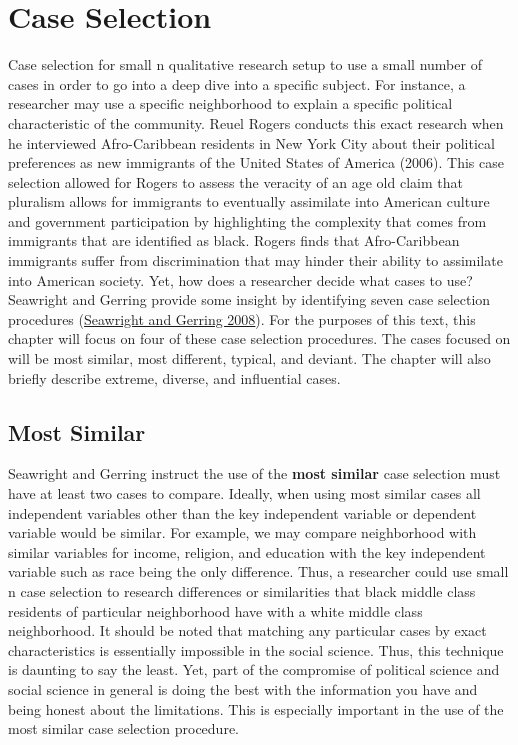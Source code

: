 \documentclass{book}
\begin{document}
\hypertarget{case-selection}{%
\section{Case Selection}\label{case-selection}}

Case selection for small n qualitative research setup to use a small number of
cases in order to go into a deep dive into a specific subject. For instance, a
researcher may use a specific neighborhood to explain a specific political
characteristic of the community. Reuel Rogers conducts this exact research
when he interviewed Afro-Caribbean residents in New York City about their
political preferences as new immigrants of the United States of America
(2006). This case selection allowed for Rogers to assess the veracity of an
age old claim that pluralism allows for immigrants to eventually assimilate
into American culture and government participation by highlighting the
complexity that comes from immigrants that are identified as black. Rogers
finds that Afro-Caribbean immigrants suffer from discrimination that may
hinder their ability to assimilate into American society. Yet, how does a
researcher decide what cases to use? Seawright and Gerring provide some
insight by identifying seven case selection procedures
(\protect\hyperlink{ref-seawright2008case}{Seawright and Gerring 2008}). For
the purposes of this text, this chapter will focus on four of these case
selection procedures. The cases focused on will be most similar, most
different, typical, and deviant. The chapter will also briefly describe
extreme, diverse, and influential cases.

\hypertarget{most-similar}{%
\subsection{Most Similar}\label{most-similar}}

Seawright and Gerring instruct the use of the \textbf{most similar} case
selection must have at least two cases to compare. Ideally, when using most
similar cases all independent variables other than the key independent
variable or dependent variable would be similar. For example, we may compare
neighborhood with similar variables for income, religion, and education with
the key independent variable such as race being the only difference. Thus, a
researcher could use small n case selection to research differences or
similarities that black middle class residents of particular neighborhood have
with a white middle class neighborhood. It should be noted that matching any
particular cases by exact characteristics is essentially impossible in the
social science. Thus, this technique is daunting to say the least. Yet, part
of the compromise of political science and social science in general is doing
the best with the information you have and being honest about the limitations.
This is especially important in the use of the most similar case selection
procedure.
\end{document}
